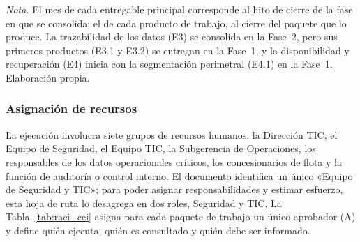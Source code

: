 {\footnotesize\textit{Nota.} El mes de cada entregable principal corresponde al hito de cierre de la fase en que se consolida;
    el de cada producto de trabajo, al cierre del paquete que lo produce. La trazabilidad de los datos (E3) se consolida en la
    Fase~2, pero sus primeros productos (E3.1 y E3.2) se entregan en la Fase~1, y la disponibilidad y recuperación (E4)
    inicia con la segmentación perimetral (E4.1) en la Fase~1. Elaboración propia.\par}



\subsubsection{Asignación de recursos}

La ejecución involucra siete grupos de recursos humanos: la Dirección TIC, el Equipo de Seguridad, el Equipo TIC, la Subgerencia de
Operaciones, los responsables de los datos operacionales críticos, los concesionarios de flota y la función de auditoría o control
interno. El documento identifica un único «Equipo de Seguridad y TIC»; para poder asignar responsabilidades y estimar esfuerzo, esta
hoja de ruta lo desagrega en dos roles, Seguridad y TIC. La Tabla~\ref{tab:raci_cci} asigna para cada paquete de trabajo un único
aprobador (A) y define quién ejecuta, quién es consultado y quién debe ser informado.

